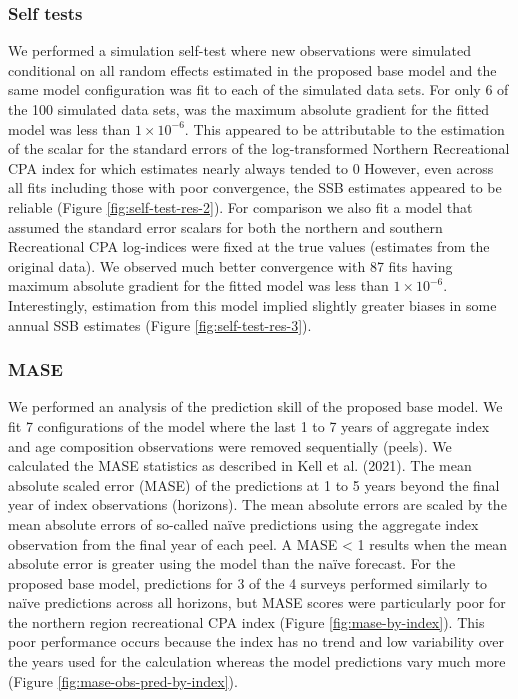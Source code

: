 \documentclass[
]{article}
\begin{document}
\hypertarget{self-tests}{%
\subsubsection{Self tests}\label{self-tests}}

We performed a simulation self-test where new observations were simulated conditional on all random effects estimated in the proposed base model and the same model configuration was fit to each of the simulated data sets. For only 6 of the 100 simulated data sets, was the maximum absolute gradient for the fitted model was less than \(1\times10^{-6}\). This appeared to be attributable to the estimation of the scalar for the standard errors of the log-transformed Northern Recreational CPA index for which estimates nearly always tended to 0 However, even across all fits including those with poor convergence, the SSB estimates appeared to be reliable (Figure \ref{fig:self-test-res-2}). For comparison we also fit a model that assumed the standard error scalars for both the northern and southern Recreational CPA log-indices were fixed at the true values (estimates from the original data). We observed much better convergence with 87 fits having maximum absolute gradient for the fitted model was less than \(1\times10^{-6}\). Interestingly, estimation from this model implied slightly greater biases in some annual SSB estimates (Figure \ref{fig:self-test-res-3}).

\hypertarget{mase}{%
\subsubsection{MASE}\label{mase}}

We performed an analysis of the prediction skill of the proposed base model. We fit 7 configurations of the model where the last 1 to 7 years of aggregate index and age composition observations were removed sequentially (peels). We calculated the MASE statistics as described in Kell et al. (2021). The mean absolute scaled error (MASE) of the predictions at 1 to 5 years beyond the final year of index observations (horizons). The mean absolute errors are scaled by the mean absolute errors of so-called naïve predictions using the aggregate index observation from the final year of each peel. A MASE \textless{} 1 results when the mean absolute error is greater using the model than the naïve forecast. For the proposed base model, predictions for 3 of the 4 surveys performed similarly to naïve predictions across all horizons, but MASE scores were particularly poor for the northern region recreational CPA index (Figure \ref{fig:mase-by-index}). This poor performance occurs because the index has no trend and low variability over the years used for the calculation whereas the model predictions vary much more (Figure \ref{fig:mase-obs-pred-by-index}).
\end{document}
